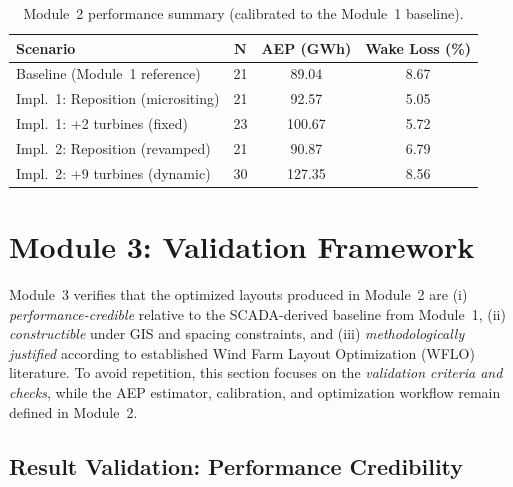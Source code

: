 \documentclass[lettersize,journal]{IEEEtran}
\begin{document}
\begin{table}[H]
\caption{Module~2 performance summary (calibrated to the Module~1 baseline).}
\label{tab:m2_results}
\centering
\renewcommand{\arraystretch}{1.1}
\begin{tabular}{lccc}
\hline
\textbf{Scenario} & $\mathbf{N}$ & \textbf{AEP (GWh)} & \textbf{Wake Loss (\%)} \\
\hline
Baseline (Module~1 reference) & 21 & 89.04 & 8.67 \\
Impl.~1: Reposition (micrositing) & 21 & 92.57 & 5.05 \\
Impl.~1: +2 turbines (fixed) & 23 & 100.67 & 5.72 \\
Impl.~2: Reposition (revamped) & 21 & 90.87 & 6.79 \\
Impl.~2: +9 turbines (dynamic) & 30 & 127.35 & 8.56 \\
\hline
\end{tabular}
\end{table}



\section{Module 3: Validation Framework}
\label{sec:validation}

Module~3 verifies that the optimized layouts produced in Module~2 are (i) \emph{performance-credible} relative to the SCADA-derived baseline from Module~1, (ii) \emph{constructible} under GIS and spacing constraints, and (iii) \emph{methodologically justified} according to established Wind Farm Layout Optimization (WFLO) literature. To avoid repetition, this section focuses on the \emph{validation criteria and checks}, while the AEP estimator, calibration, and optimization workflow remain defined in Module~2.


\subsection{Result Validation: Performance Credibility}
\label{subsec:result_validation}
\end{document}
